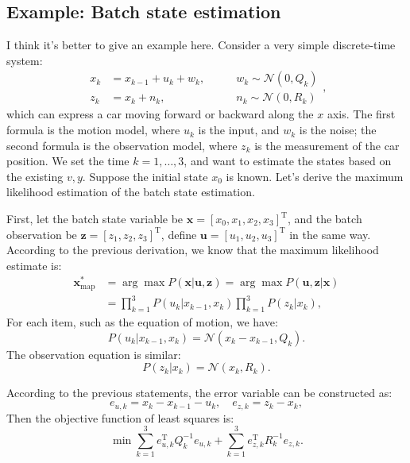 \subsection{Example: Batch state estimation}
I think it's better to give an example here. Consider a very simple discrete-time system:
\begin{equation}
    \begin{array}{lll}
        {x_k} &= {x_{k-1}} + {u_k} + {w_k},&\qquad w_k \sim \mathcal{N}\left( {0,Q_k} \right)\\
        {z_k} &= {x_k} + {n_k},&\qquad {n_k}\sim \mathcal{N}\left( {0,R_k} \right)
    \end{array},
\end{equation}
which can express a car moving forward or backward along the $x$ axis. The first formula is the motion model, where $u_k$ is the input, and $w_k$ is the noise; the second formula is the observation model, where $z_k$ is the measurement of the car position. We set the time $k=1,\ldots,3$, and want to estimate the states based on the existing $v,y$. Suppose the initial state $x_0$ is known. Let's derive the maximum likelihood estimation of the batch state estimation.

First, let the batch state variable be $\bm{x} = [x_0,x_1, x_2, x_3]^\mathrm{T}$, and the batch observation be $\bm{z} = [z_1,z_2,z_3]^ \mathrm{T}$, define $\bm{u}=[u_1,u_2,u_3]^\mathrm{T}$ in the same way. According to the previous derivation, we know that the maximum likelihood estimate is:
\begin{equation}
    \begin{aligned}
        {\bm{x}_{\mathrm{map}}^*} &= \arg \max P(\bm{x}|\bm{u},\bm{z}) = \arg \max P( \bm{u},\bm{z}|\bm{x})\\
        &= \prod\limits_{k = 1}^3 {P({u_k}|{x_{k-1}},{x_k})\prod\limits_{k = 1}^3 {P\left( { {z_k}|{x_k}} \right)} },
    \end{aligned}
\end{equation}
For each item, such as the equation of motion, we have:
\begin{equation}
    P({u_k}|{x_{k-1}},{x_k}) = \mathcal{N}({x_k}-{x_{k-1}},{Q_k}).
\end{equation}
The observation equation is similar:
\begin{equation}
    P\left( {{z_k}|{x_k}} \right) = \mathcal{N}\left( {{x_k},{R_k}} \right).
\end{equation}

According to the previous statements, the error variable can be constructed as:
\begin{equation}
    {e_{u,k}} = {x_k}-{x_{k-1}}-{u_k}, \quad {e_{z,k}} = {z_k}-{x_k},
\end{equation}
Then the objective function of least squares is:
\begin{equation}
    \min \sum\limits_{k = 1}^3 {e_{u,k}^\mathrm{T} Q_k^{-1}{e_{u,k}}} + \sum\limits_{k = 1 }^3 {e_{z,k}^\mathrm{T}{R^{-1}_k}{e_{z,k}}}.
\end{equation}

